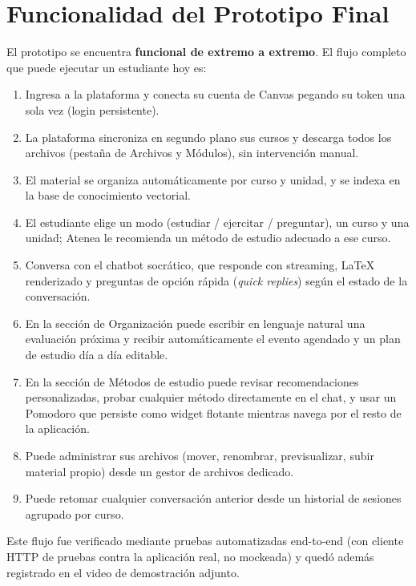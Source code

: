 \documentclass[11pt,a4paper]{article}
\begin{document}
\section{Funcionalidad del Prototipo Final}

El prototipo se encuentra \textbf{funcional de extremo a extremo}. El flujo completo que puede ejecutar un estudiante hoy es:

\begin{enumerate}
\item Ingresa a la plataforma y conecta su cuenta de Canvas pegando su token una sola vez (login persistente).
\item La plataforma sincroniza en segundo plano sus cursos y descarga todos los archivos (pesta\~na de Archivos y M\'odulos), sin intervenci\'on manual.
\item El material se organiza autom\'aticamente por curso y unidad, y se indexa en la base de conocimiento vectorial.
\item El estudiante elige un modo (estudiar / ejercitar / preguntar), un curso y una unidad; Atenea le recomienda un m\'etodo de estudio adecuado a ese curso.
\item Conversa con el chatbot socr\'atico, que responde con streaming, LaTeX renderizado y preguntas de opci\'on r\'apida (\emph{quick replies}) seg\'un el estado de la conversaci\'on.
\item En la secci\'on de Organizaci\'on puede escribir en lenguaje natural una evaluaci\'on pr\'oxima y recibir autom\'aticamente el evento agendado y un plan de estudio d\'ia a d\'ia editable.
\item En la secci\'on de M\'etodos de estudio puede revisar recomendaciones personalizadas, probar cualquier m\'etodo directamente en el chat, y usar un Pomodoro que persiste como widget flotante mientras navega por el resto de la aplicaci\'on.
\item Puede administrar sus archivos (mover, renombrar, previsualizar, subir material propio) desde un gestor de archivos dedicado.
\item Puede retomar cualquier conversaci\'on anterior desde un historial de sesiones agrupado por curso.
\end{enumerate}

Este flujo fue verificado mediante pruebas automatizadas end-to-end (con cliente HTTP de pruebas contra la aplicaci\'on real, no mockeada) y qued\'o adem\'as registrado en el video de demostraci\'on adjunto.
\end{document}
